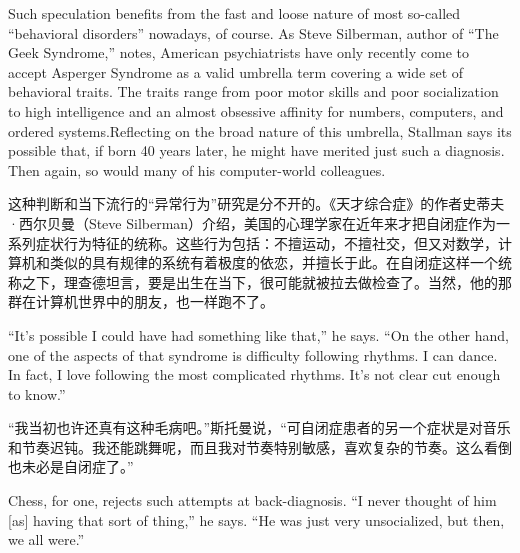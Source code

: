 \ifdefined\eng
Such speculation benefits from the fast and loose nature of most so-called ``behavioral disorders'' nowadays, of course. As Steve Silberman, author of ``The Geek Syndrome,'' notes, American psychiatrists have only recently come to accept Asperger Syndrome as a valid umbrella term covering a wide set of behavioral traits. The traits range from poor motor skills and poor socialization to high intelligence and an almost obsessive affinity for numbers, computers, and ordered systems.Reflecting on the broad nature of this umbrella, Stallman says its possible that, if born 40 years later, he might have merited just such a diagnosis. Then again, so would many of his computer-world colleagues.
\fi

\ifdefined\chs
这种判断和当下流行的``异常行为''研究是分不开的。《天才综合症》的作者史蒂夫·西尔贝曼（Steve Silberman）介绍，美国的心理学家在近年来才把自闭症作为一系列症状行为特征的统称。这些行为包括：不擅运动，不擅社交，但又对数学，计算机和类似的具有规律的系统有着极度的依恋，并擅长于此。在自闭症这样一个统称之下，理查德坦言，要是出生在当下，很可能就被拉去做检查了。当然，他的那群在计算机世界中的朋友，也一样跑不了。
\fi

\ifdefined\eng
``It's possible I could have had something like that,'' he says. ``On the other hand, one of the aspects of that syndrome is difficulty following rhythms. I can dance. In fact, I love following the most complicated rhythms. It's not clear cut enough to know.''  %
\fi

\ifdefined\chs
``我当初也许还真有这种毛病吧。''斯托曼说，``可自闭症患者的另一个症状是对音乐和节奏迟钝。我还能跳舞呢，而且我对节奏特别敏感，喜欢复杂的节奏。这么看倒也未必是自闭症了。''%
\fi

\ifdefined\eng
Chess, for one, rejects such attempts at back-diagnosis. ``I never thought of him [as] having that sort of thing,'' he says. ``He was just very unsocialized, but then, we all were.''
\fi

